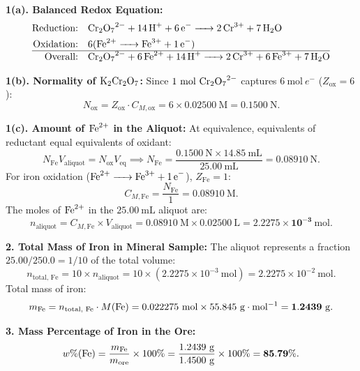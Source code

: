 \begin{solution}
\textbf{1(a). Balanced Redox Equation:}
\begin{align*}
\text{Reduction:} \quad & \ce{Cr2O7^{2-} + 14 H+ + 6 e- -> 2 Cr^{3+} + 7 H2O} \\
\text{Oxidation:} \quad & 6(\ce{Fe^{2+} -> Fe^{3+} + 1 e-}) \\
\hline
\text{Overall:} \quad & \ce{Cr2O7^{2-} + 6 Fe^{2+} + 14 H+ -> 2 Cr^{3+} + 6 Fe^{3+} + 7 H2O}
\end{align*}

\textbf{1(b). Normality of $\ce{K2Cr2O7}$:}
Since $1\ \mathrm{mol}\ \ce{Cr2O7^{2-}}$ captures $6\ \mathrm{mol}\ e^-$ ($Z_{\text{ox}} = 6$):
\[
N_{\text{ox}} = Z_{\text{ox}} \cdot C_{M,\text{ox}} = 6 \times 0.02500\ \mathrm{M} = \mathbf{0.1500\ \mathrm{N}}.
\]

\textbf{1(c). Amount of $\ce{Fe^{2+}}$ in the Aliquot:}
At equivalence, equivalents of reductant equal equivalents of oxidant:
\[
N_{\text{Fe}} V_{\text{aliquot}} = N_{\text{ox}} V_{\text{eq}} \implies N_{\text{Fe}} = \frac{0.1500\ \mathrm{N} \times 14.85\ \mathrm{mL}}{25.00\ \mathrm{mL}} = 0.08910\ \mathrm{N}.
\]
For iron oxidation ($\ce{Fe^{2+} -> Fe^{3+} + 1 e-}$), $Z_{\text{Fe}} = 1$:
\[
C_{M,\text{Fe}} = \frac{N_{\text{Fe}}}{1} = 0.08910\ \mathrm{M}.
\]
The moles of $\ce{Fe^{2+}}$ in the $25.00\ \mathrm{mL}$ aliquot are:
\[
n_{\text{aliquot}} = C_{M,\text{Fe}} \times V_{\text{aliquot}} = 0.08910\ \mathrm{M} \times 0.02500\ \mathrm{L} = \mathbf{2.2275 \times 10^{-3}\ \mathrm{mol}}.
\]

\textbf{2. Total Mass of Iron in Mineral Sample:}
The aliquot represents a fraction $25.00 / 250.0 = 1/10$ of the total volume:
\[
n_{\text{total, Fe}} = 10 \times n_{\text{aliquot}} = 10 \times (2.2275 \times 10^{-3}\ \mathrm{mol}) = 2.2275 \times 10^{-2}\ \mathrm{mol}.
\]
Total mass of iron:
\[
m_{\text{Fe}} = n_{\text{total, Fe}} \cdot M(\ce{Fe}) = 0.022275\ \mathrm{mol} \times 55.845\ \mathrm{g\cdot mol^{-1}} = \mathbf{1.2439\ \mathrm{g}}.
\]

\textbf{3. Mass Percentage of Iron in the Ore:}
\[
w\%(\ce{Fe}) = \frac{m_{\text{Fe}}}{m_{\text{ore}}} \times 100\% = \frac{1.2439\ \mathrm{g}}{1.4500\ \mathrm{g}} \times 100\% = \mathbf{85.79\%}.
\]
\end{solution}

